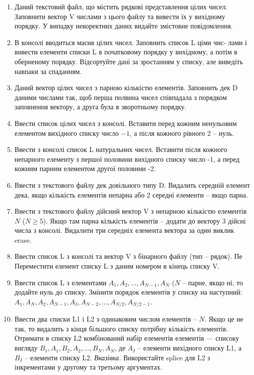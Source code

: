 \documentclass[]{article}
\begin{document}
\begin{enumerate}
\def\labelenumi{\arabic{enumi}.}
\item
  Даний текстовий файл, що містить рядкові представлення цілих чисел.
  Заповнити вектор V числами з цього файлу та вивести їх у вихідному
  порядку. У випадку некоректних даних видайте змістовне повідомлення.
\item
  В консолі вводиться масив цілих чисел. Заповнить список L ціми чис-
  лами і вивести елементи списки L в початковому порядку у вихідному, а
  потім в оберненому порядку. Відсортуйте дані за зростанням у списку,
  але виведіть навпаки за спаданням.
\item
  Даний вектор цілих чисел з парною кількістю елементів. Заповнить дек D
  даними числами так, щоб перша полвина чисел співпадала з порядком
  заповнення вектору, а друга була в зворотньому порядку.
\item
  Ввести список цілих чисел з консолі. Вставити перед кожним ненульовим
  елементом вихідного списку число \(- 1\), а після кожного рівного 2 --
  нуль.
\item
  Ввести з консолі список L натуральних чисел. Вставити після кожного
  непарного елементу з першої половини вихідного списку число -1, а
  перед кожним парним елементом другої половини -2.
\item
  Ввести з текстового файлу дек довільного типу D. Видалить середній
  елемент дека, якщо кількість елементів непарна або 2 середні елементи
  -- якщо парна.
\item
  Ввести з текстового файлу дійсний вектор V з непарною кількістю
  елементів \(N\) (\(N \geq 5\)). Якщо там парна кількість елементів --
  додати до вектору 3 дійсні числа з консолі. Видалити три середніх
  елемента вектора за один виклик erase.
\item
  Ввести список L з консолі та вектор V з бінарного файлу (тип --
  рядок). Пе Переместити елемент списку L з даним номером в кінець
  списку V.
\item
  Ввести список L з елементами \(A_{1},A_{2},\ldots,A_{N - 1},A_{N}\)
  (\(N\) -- парне, якщо ні, то додайте нуль до списку. Змінити порядок
  елементів у списку на наступний:
  \(A_{1},A_{N},A_{2},A_{N - 1},A_{3},A_{N - 2},\ldots,A_{N/2},A_{N/2 - 1}\).
\item
  Ввести два списки L1 і L2 з одинаковим числом елементів -- \(N\). Якщо
  це не так, то видалить з кінця більшого списку потрібну кількість
  елементів. Отримати в списку L2 комбінований набір елементів елементів
  --- списоку вигляду \(B_{1},A_{1},B_{2},A_{2},\ldots,B_{N},A_{N}\), де
  \(A_{I}\) -- елементи вихідного списку L1, а \(B_{I}\) -- елементи
  списку L2. \emph{Вказівка.} Використайте splice для L2 з інкрементами
  у другому та третьому аргументах.
\end{enumerate}
\end{document}
